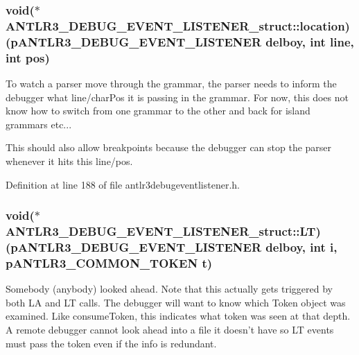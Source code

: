 \hypertarget{struct_a_n_t_l_r3___d_e_b_u_g___e_v_e_n_t___l_i_s_t_e_n_e_r__struct_a4fa291bc4f73722b4a1f40a79a9428f9}{
\subsubsection[{location}]{\setlength{\rightskip}{0pt plus 5cm}void($\ast$ A\-N\-T\-L\-R3\-\_\-\-D\-E\-B\-U\-G\-\_\-\-E\-V\-E\-N\-T\-\_\-\-L\-I\-S\-T\-E\-N\-E\-R\-\_\-struct\-::location)({\bf p\-A\-N\-T\-L\-R3\-\_\-\-D\-E\-B\-U\-G\-\_\-\-E\-V\-E\-N\-T\-\_\-\-L\-I\-S\-T\-E\-N\-E\-R} delboy, int line, int {\bf pos})}}\label{struct_a_n_t_l_r3___d_e_b_u_g___e_v_e_n_t___l_i_s_t_e_n_e_r__struct_a4fa291bc4f73722b4a1f40a79a9428f9}
To watch a parser move through the grammar, the parser needs to inform the debugger what line/char\-Pos it is passing in the grammar. For now, this does not know how to switch from one grammar to the other and back for island grammars etc...

This should also allow breakpoints because the debugger can stop the parser whenever it hits this line/pos. 

Definition at line 188 of file antlr3debugeventlistener.\-h.

\hypertarget{struct_a_n_t_l_r3___d_e_b_u_g___e_v_e_n_t___l_i_s_t_e_n_e_r__struct_afaf77e7b413b4eb08eac090fc8faf0c0}{
\subsubsection[{L\-T}]{\setlength{\rightskip}{0pt plus 5cm}void($\ast$ A\-N\-T\-L\-R3\-\_\-\-D\-E\-B\-U\-G\-\_\-\-E\-V\-E\-N\-T\-\_\-\-L\-I\-S\-T\-E\-N\-E\-R\-\_\-struct\-::\-L\-T)({\bf p\-A\-N\-T\-L\-R3\-\_\-\-D\-E\-B\-U\-G\-\_\-\-E\-V\-E\-N\-T\-\_\-\-L\-I\-S\-T\-E\-N\-E\-R} delboy, int {\bf i}, {\bf p\-A\-N\-T\-L\-R3\-\_\-\-C\-O\-M\-M\-O\-N\-\_\-\-T\-O\-K\-E\-N} {\bf t})}}\label{struct_a_n_t_l_r3___d_e_b_u_g___e_v_e_n_t___l_i_s_t_e_n_e_r__struct_afaf77e7b413b4eb08eac090fc8faf0c0}
Somebody (anybody) looked ahead. Note that this actually gets triggered by both L\-A and L\-T calls. The debugger will want to know which Token object was examined. Like consume\-Token, this indicates what token was seen at that depth. A remote debugger cannot look ahead into a file it doesn't have so L\-T events must pass the token even if the info is redundant. 

